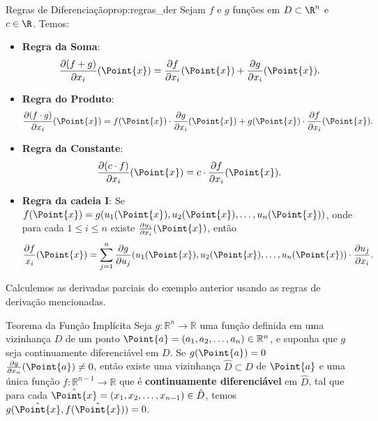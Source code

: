 \begin{proposition}{Regras de Diferenciação}{prop:regras_der}
Sejam $f$ e $g$ funções  em $D\subset\R^n$ e $c\in\R$. Temos:
\begin{itemize}[label=\color{resultscolor!150}\textbullet]
\item\textbf{Regra da Soma}:
   \[
   \frac{\partial (f+g)}{\partial x_i}(\Point{x}) = \frac{\partial f}{\partial x_i}(\Point{x}) + \frac{\partial g}{\partial x_i}(\Point{x}).
   \]


 

\item \textbf{Regra do Produto}:
   \[
   \frac{\partial (f\cdot g)}{\partial x_i}(\Point{x}) = f (\Point{x})\cdot \frac{\partial g}{\partial x_i}(\Point{x})+ g (\Point{x})\cdot\frac{\partial f}{\partial x_i} (\Point{x}) .
   \]

\item \textbf{Regra da Constante}:
\[
   \frac{\partial (c\cdot f)}{\partial x_i}(\Point{x}) = c \cdot\frac{\partial f}{\partial x_i} (\Point{x}) .
   \]

\item \textbf{Regra da cadeia I}: Se $f(\Point{x})=g(u_1(\Point{x}),u_2(\Point{x}),\dots,u_n(\Point{x}))$, onde para cada $1\leq i \leq n$ existe $\frac{\partial u_i}{\partial x_i}(\Point{x})$, então
$$\frac{\partial f}{x_i}(\Point{x})=\sum_{j=1}^n \frac{\partial g}{\partial u_j}(u_1(\Point{x}),u_2(\Point{x}),\dots,u_n(\Point{x}))\cdot \frac{\partial u_j}{\partial x_i}.  $$

   \end{itemize}
\end{proposition}

\begin{example}{}{}
Calculemos as derivadas parciais do exemplo anterior usando as regras de derivação mencionadas.     
\end{example}




\begin{theorem}{Teorema da Função Implícita}{}
Seja \(g: \mathbb{R}^n \to \mathbb{R}\) uma função definida em uma vizinhança \(D\) de um ponto \(\Point{a}=(a_1, a_2, \ldots, a_n) \in \mathbb{R}^n\), e suponha que \(g\) seja continuamente diferenciável em \(D\). Se \(g(\Point{a}) = 0\) \(\frac{\partial g}{\partial x_n}(\Point{a})\neq 0\), então existe uma vizinhança \(\hat{D} \subset D\) de \(\Point{a}\) e uma única função \(f: \mathbb{R}^{n-1} \to \mathbb{R}\) que é \textbf{continuamente diferenciável} em \(\hat{D}\), tal que para cada \(\hat{\Point{x}}=(x_1, x_2, \ldots, x_{n-1}) \in \hat{D}\), temos \(g(\hat{\Point{x}}, f(\hat{\Point{x}})) = 0\).
\end{theorem}



